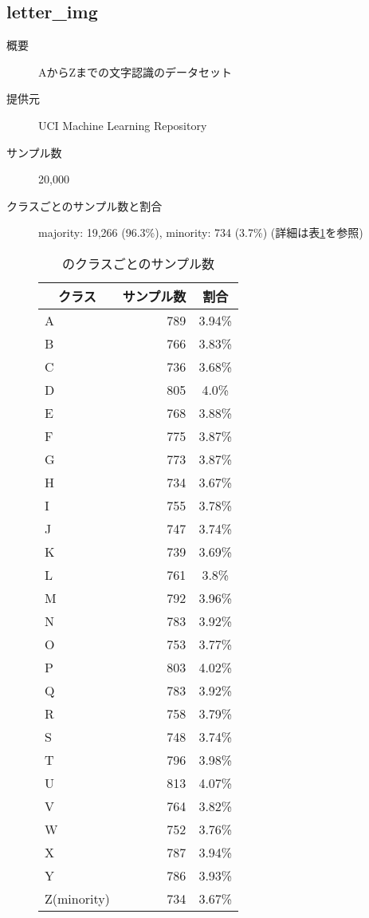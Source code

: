 \subsection{letter\_img}
\begin{description}
    \item[概要] AからZまでの文字認識のデータセット
    \cite{letterimg}
    \item[提供元] UCI Machine Learning Repository
    \item[サンプル数] 20,000
    \item[クラスごとのサンプル数と割合] majority: 19,266 (96.3\%), minority: 734 (3.7\%) 
    (詳細は表\ref{tab:letterimg}を参照)

        \begin{table}[htbp]
            \centering
            \caption{のクラスごとのサンプル数}
            \label{tab:letterimg}
            \begin{tabular}{lrc} \hline
                \multicolumn{1}{c}{クラス}&
                \multicolumn{1}{c}{サンプル数}&
                \multicolumn{1}{c}{割合}\\
                \hline
                \hline
                A&789&3.94\%\\
                B&766&3.83\%\\
                C&736&3.68\%\\
                D&805&4.0\%\\
                E&768&3.88\%\\
                F&775&3.87\%\\
                G&773&3.87\%\\
                H&734&3.67\%\\
                I&755&3.78\%\\
                J&747&3.74\%\\
                K&739&3.69\%\\
                L&761&3.8\%\\
                M&792&3.96\%\\
                N&783&3.92\%\\
                O&753&3.77\%\\
                P&803&4.02\%\\
                Q&783&3.92\%\\
                R&758&3.79\%\\
                S&748&3.74\%\\
                T&796&3.98\%\\
                U&813&4.07\%\\
                V&764&3.82\%\\
                W&752&3.76\%\\
                X&787&3.94\%\\
                Y&786&3.93\%\\
                Z(minority)&734&3.67\%\\
                \hline
            \end{tabular}
        \end{table}


\end{description}
